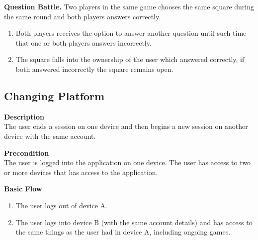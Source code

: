 \textbf{Question Battle.}
Two players in the same game chooses the same square during the same round and both players answers correctly.
\begin{enumerate}
	\item Both players receives the option to answer another question until such time that one or both players answers incorrectly.
	\item The square falls into the ownership of the user which answered correctly, if both answered incorrectly the square remains open.
\end{enumerate}

\subsection{Changing Platform}
\textbf{Description}\\
The user ends a session on one device and then begins a new session on another device with the same account.

\textbf{Precondition}\\
The user is logged into the application on one device.
The user has access to two or more devices that has access to the application.

\textbf{Basic Flow}\\
\begin{enumerate}
\item The user logs out of device A.
\item The user logs into device B (with the same account details) and has access to the same things as the user had in device A, including ongoing games.
\end{enumerate}